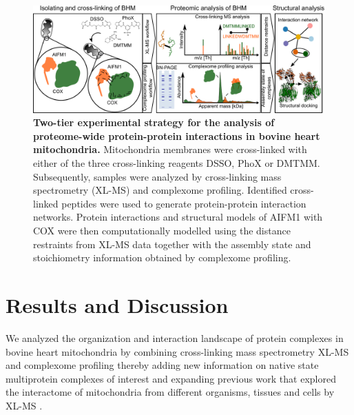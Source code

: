 \begin{figure}[htb]
    \center
    \includegraphics[]{Chapter.3/Figures/Figure1.png}
    \caption{\textbf{Two-tier experimental strategy for the analysis of proteome-wide protein-protein interactions in bovine heart mitochondria.} Mitochondria membranes were cross-linked with either of the three cross-linking reagents DSSO, PhoX or DMTMM. Subsequently, samples were analyzed by cross-linking mass spectrometry (XL-MS) and complexome profiling. Identified cross-linked peptides were used to generate protein-protein interaction networks. Protein interactions and structural models of AIFM1 with COX were then computationally modelled using the distance restraints from XL-MS data together with the assembly state and stoichiometry information obtained by complexome profiling.}
    \label{fig:ch3_fig1}
\end{figure} \clearpage
%
\section{Results and Discussion}
We analyzed the organization and interaction landscape of protein complexes in bovine heart mitochondria by combining cross-linking mass spectrometry XL-MS and complexome profiling \cite{RN15, RN11} thereby adding new information on native state multiprotein complexes of interest and expanding previous work that explored the interactome of mitochondria from different organisms, tissues and cells by XL-MS \cite{RN20, RN18, RN16, RN19, RN17}.
%
